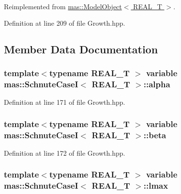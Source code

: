 Reimplemented from \hyperlink{structmas_1_1_model_object_a8eaf6c7c52e42ea8869aefa318358cb5}{mas\-::\-Model\-Object$<$ R\-E\-A\-L\-\_\-\-T $>$}.



Definition at line 209 of file Growth.\-hpp.



\subsection{Member Data Documentation}
\hypertarget{structmas_1_1_schnute_case_i_a65872d07f8ecb249f7eecc7d167d8393}{
\subsubsection[{alpha}]{\setlength{\rightskip}{0pt plus 5cm}template$<$typename R\-E\-A\-L\-\_\-\-T $>$ {\bf variable} {\bf mas\-::\-Schnute\-Case\-I}$<$ R\-E\-A\-L\-\_\-\-T $>$\-::alpha}}\label{structmas_1_1_schnute_case_i_a65872d07f8ecb249f7eecc7d167d8393}


Definition at line 171 of file Growth.\-hpp.

\hypertarget{structmas_1_1_schnute_case_i_a375472b1c6d9a60992aba819d54b4ece}{
\subsubsection[{beta}]{\setlength{\rightskip}{0pt plus 5cm}template$<$typename R\-E\-A\-L\-\_\-\-T $>$ {\bf variable} {\bf mas\-::\-Schnute\-Case\-I}$<$ R\-E\-A\-L\-\_\-\-T $>$\-::beta}}\label{structmas_1_1_schnute_case_i_a375472b1c6d9a60992aba819d54b4ece}


Definition at line 172 of file Growth.\-hpp.

\hypertarget{structmas_1_1_schnute_case_i_ac393da368b9ab41438b697d78b700ee7}{
\subsubsection[{lmax}]{\setlength{\rightskip}{0pt plus 5cm}template$<$typename R\-E\-A\-L\-\_\-\-T $>$ {\bf variable} {\bf mas\-::\-Schnute\-Case\-I}$<$ R\-E\-A\-L\-\_\-\-T $>$\-::lmax}}\label{structmas_1_1_schnute_case_i_ac393da368b9ab41438b697d78b700ee7}


